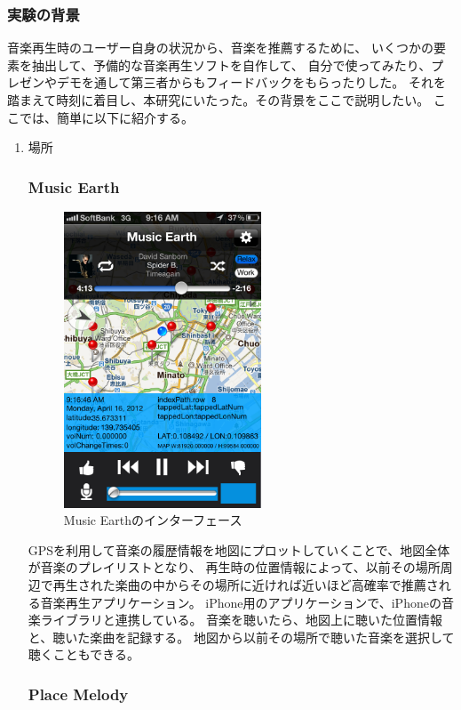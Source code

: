\documentclass[11pt, twocolumn]{jsarticle}
\begin{document}
\subsubsection{実験の背景}
音楽再生時のユーザー自身の状況から、音楽を推薦するために、
いくつかの要素を抽出して、予備的な音楽再生ソフトを自作して、
自分で使ってみたり、プレゼンやデモを通して第三者からもフィードバックをもらったりした。
それを踏まえて時刻に着目し、本研究にいたった。その背景をここで説明したい。
ここでは、簡単に以下に紹介する。
\begin{enumerate}
\item
場所

\subsubsection{Music Earth}

\begin{figure}[h]
\begin{center}
\includegraphics[width=5.866cm]{musicEarth.png}
\caption{Music Earthのインターフェース}
\label{musicEarth_interface}
\end{center}
\end{figure}

GPSを利用して音楽の履歴情報を地図にプロットしていくことで、地図全体が音楽のプレイリストとなり、
再生時の位置情報によって、以前その場所周辺で再生された楽曲の中からその場所に近ければ近いほど高確率で推薦される音楽再生アプリケーション。
iPhone用のアプリケーションで、iPhoneの音楽ライブラリと連携している。
音楽を聴いたら、地図上に聴いた位置情報と、聴いた楽曲を記録する。
地図から以前その場所で聴いた音楽を選択して聴くこともできる。
\subsubsection{Place Melody}


\end{enumerate}
\end{document}
